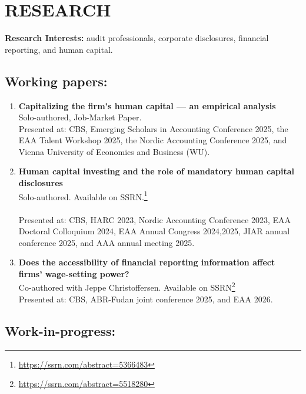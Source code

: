 \documentclass[letterpaper,9pt]{extarticle}
\begin{document}
\section*{RESEARCH}
\noindent
\textbf{Research Interests:} audit professionals, corporate disclosures, financial reporting, and human capital.

\subsection*{Working papers:}
\begin{enumerate}
     
    
\item \textbf{Capitalizing the firm's human capital --- an empirical analysis} \\
Solo-authored, Job-Market Paper.\\

Presented at: CBS, Emerging Scholars in Accounting Conference 2025, the EAA Talent Workshop 2025, the Nordic Accounting Conference 2025, and Vienna University of Economics and Business (WU).
\\

\item \textbf{Human capital investing and the role of mandatory human capital disclosures} \\
Solo-authored. Available on SSRN.\footnote{\url{https://ssrn.com/abstract=5366483}}\\
\\
Presented at: CBS, HARC 2023, Nordic Accounting Conference 2023, EAA Doctoral Colloquium 2024, EAA Annual Congress 2024,2025, JIAR annual conference 2025, and AAA annual meeting 2025. \\

\item  \textbf{Does the accessibility of financial reporting information affect firms' wage-setting power?} \\
Co-authored with Jeppe Christoffersen. Available on SSRN\footnote{\url{https://ssrn.com/abstract=5518280}} \\

Presented at: CBS, ABR-Fudan joint conference 2025, and EAA 2026.
\end{enumerate}

\subsection*{Work-in-progress:}
\end{document}
